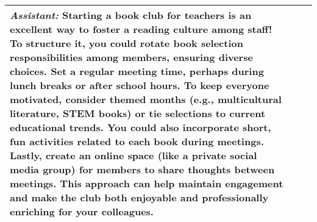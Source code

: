 \begin{table}[H]
{\begin{tabular}{p{}|p{}|p{}}
\textbf{\textit{Assistant:}} Starting a book club for teachers is an excellent way to foster a reading culture among staff! To structure it, you could rotate book selection responsibilities among members, ensuring diverse choices. Set a regular meeting time, perhaps during lunch breaks or after school hours. To keep everyone motivated, consider themed months (e.g., multicultural literature, STEM books) or tie selections to current educational trends. You could also incorporate short, fun activities related to each book during meetings. Lastly, create an online space (like a private social media group) for members to share thoughts between meetings. This approach can help maintain engagement and make the club both enjoyable and professionally enriching for your colleagues. \\
\hline



\end{tabular}}
\label{tab:implicit_persona}
\end{table}

